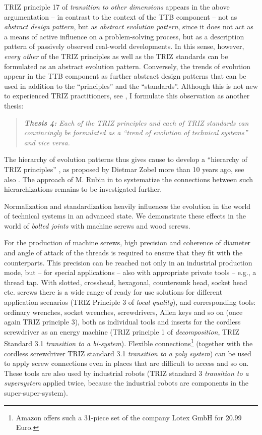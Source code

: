 \documentclass[11pt,a4paper]{article}
\begin{document}
TRIZ principle 17 of \emph{transition to other dimensions} appears in the
above argumentation -- in contrast to the context of the TTB component -- not
as \emph{abstract design pattern}, but as \emph{abstract evolution pattern},
since it does not act as a means of active influence on a problem-solving
process, but as a description pattern of passively observed real-world
developments. In this sense, however, \emph{every other} of the TRIZ
principles as well as the TRIZ standards can be formulated as an abstract
evolution pattern. Conversely, the trends of evolution appear in the TTB
component as further abstract design patterns that can be used in addition to
the ``principles'' and the ``standards''. Although this is not new to
experienced TRIZ practitioners, see \cite{Shub2006}, I formulate this
observation as another thesis:
\begin{quote}\it
 \textbf{Thesis 4:} Each of the TRIZ principles and each of TRIZ standards can
 convincingly be formulated as a ``trend of evolution of technical systems''
 and vice versa.
\end{quote}
The hierarchy of evolution patterns thus gives cause to develop a ``hierarchy
of TRIZ principles'' \cite[chapter 3]{Zobel2016}, as proposed by Dietmar Zobel
more than 10 years ago, see also \cite{Zobel2020}.  The approach of M. Rubin
in \cite{Rubin2019} to systematize the connections between such
hierarchizations remains to be investigated further.

Normalization and standardization heavily influences the evolution in the
world of technical systems in an advanced state.  We demonstrate these effects
in the world of \emph{bolted joints} with machine screws and wood screws.

For the production of machine screws, high precision and coherence of diameter
and angle of attack of the threads is required to ensure that they fit with
the counterparts. This precision can be reached not only in an industrial
production mode, but -- for special applications -- also with appropriate
private tools -- e.g., a thread tap. With slotted, crosshead, hexagonal,
countersunk head, socket head etc. screws there is a wide range of ready for
use solutions for different application scenarios (TRIZ Principle 3 of
\emph{local quality}), and corresponding tools: ordinary wrenches, socket
wrenches, screwdrivers, Allen keys and so on (once again TRIZ principle 3),
both as individual tools and inserts for the cordless screwdriver as an energy
machine (TRIZ principle 1 of \emph{decomposition}, TRIZ Standard 3.1
\emph{transition to a bi-system}).  Flexible connections\footnote{Amazon
  offers such a 31-piece set of the company Lotex GmbH for 20.99 Euro.}
(together with the cordless screwdriver TRIZ standard 3.1 \emph{transition to
  a poly system}) can be used to apply screw connections even in places that
are difficult to access and so on. These tools are also used by industrial
robots (TRIZ standard 3 \emph{transition to a supersystem} applied twice,
because the industrial robots are components in the super-super-system).
\end{document}
